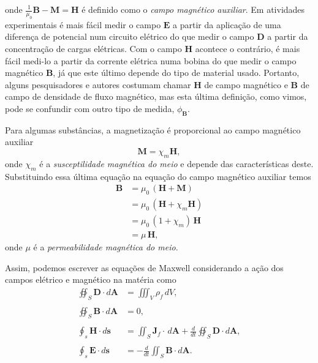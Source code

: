 onde $\frac{1}{\mu_0}\mathbf{B}-\mathbf{M}=\mathbf{H}$ \'e definido como o \textit{campo magn\'etico auxiliar}. Em atividades experimentais \'e mais f\'acil medir o campo 
$\mathbf{E}$ a partir da aplica\c{c}\~ao de uma diferen\c{c}a de potencial num circuito el\'etrico do que medir o campo $\mathbf{D}$ a partir da concentra\c{c}\~ao de cargas el\'etricas. Com o campo $\mathbf{H}$ acontece o contr\'ario, \'e mais f\'acil medi-lo a partir da corrente el\'etrica numa bobina do que medir o campo magn\'etico $\mathbf{B}$, j\'a que este \'ultimo depende do tipo de material usado. Portanto, alguns pesquisadores e autores costumam chamar $\mathbf{H}$ de campo magn\'etico e $\mathbf{B}$ de campo de densidade de fluxo magn\'etico, mas esta \'ultima defini\c{c}\~ao, como vimos, pode se confundir com outro tipo de medida, $\phi_\mathbf{B}$.

Para algumas subst\^ancias, a magnetiza\c{c}\~ao \'e proporcional ao campo magn\'etico auxiliar
\begin{equation*}
\mathbf{M}=\chi_m\mathbf{H},
\end{equation*}
onde $\chi_m$ \'e a \textit{susceptilidade magn\'etica do meio} e depende das caracter\'isticas deste. Substituindo essa \'ultima equa\c{c}\~ao na equa\c{c}\~ao do campo magn\'etico auxiliar temos
\begin{align}\label{eq.B_funcao_H}\nonumber
\mathbf{B}&=\mu_0\,(\mathbf{H}+\mathbf{M})\\\nonumber
&=\mu_0\,(\mathbf{H}+\chi_m\mathbf{H})\\\nonumber
&=\mu_0\,(1+\chi_m)\,\mathbf{H}\\
&=\mu\,\mathbf{H},
\end{align}
onde $\mu$ \'e a \textit{permeabilidade magn\'etica do meio}.

Assim, podemos escrever as equa\c{c}\~oes de Maxwell considerando a a\c{c}\~ao dos campos el\'etrico e magn\'etico na mat\'eria como
\begin{align}\label{eq.max_meio_1}
\oiint_S\mathbf{D}\cdot d\mathbf{A}&=\iiint_{V}\rho_f\,dV,\\\nonumber\\\label{eq.max_meio_2}
\oiint_S\textbf{B}\cdot\textit{d}\textbf{A}&=0,\\\nonumber\\\label{eq.max_meio_3}
\oint_s\mathbf{H}\cdot d\mathbf{s}&=\iint_S\mathbf{J}_f\cdot\,d\mathbf{A}+\frac{d}{dt}\oiint_S\mathbf{D}\cdot\textit{d}\textbf{A},\\\nonumber\\\label{eq.max_meio_4}
\oint_s\mathbf{E}\cdot d\mathbf{s}&=-\frac{d}{dt}\iint_S\mathbf{B}\cdot d\mathbf{A}.
\end{align}

